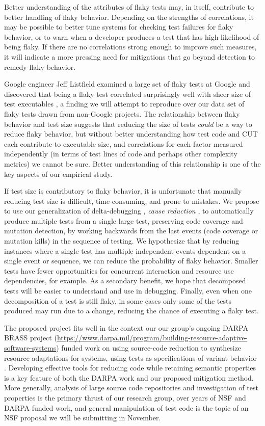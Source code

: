 \documentclass[10pt]{article}
\begin{document}
  Better understanding of the attributes of flaky tests may, in itself, contribute to better handling of flaky behavior.  Depending on the strengths of correlations, it may be possible to better tune systems for checking test failures for flaky behavior, or to warn when a developer produces a test that has high likelihood of being flaky.  If there are no correlations strong enough to improve such measures, it will indicate a more pressing need for mitigations that go beyond detection to remedy flaky behavior.

Google engineer Jeff Listfield examined a large set of flaky tests at Google and discovered that being a flaky test correlated surprisingly well with sheer size of test executables \cite{listfieldtestanalysis}, a finding we will attempt to reproduce over our data set of flaky tests drawn from non-Google projects.  The relationship between flaky behavior and test size suggests that reducing the size of tests \emph{could} be a way to reduce flaky behavior, but without better understanding how test code and CUT each contribute to executable size, and correlations for  each factor measured independently (in terms of test lines of code and perhaps other complexity metrics) we cannot be sure.  Better understanding of this relationship is one of the key aspects of our empirical study.

If test size is contributory to flaky behavior, it is unfortunate that manually reducing test size is difficult, time-consuming, and prone to mistakes.  We propose to use our generalization of delta-debugging \cite{DD}, \emph{cause reduction} \cite{stvrcausereduce}, to automatically produce multiple tests from a single large test, preserving code coverage and mutation detection, by working backwards from the last events (code coverage or mutation kills) in the sequence of testing.  We hypothesize that by reducing instances where a single test has multiple independent events dependent on a single event or sequence, we can reduce the probability of flaky behavior.  Smaller tests have fewer opportunities for concurrent interaction and resource use dependencies, for example.  As a secondary benefit, we hope that decomposed tests will be easier to understand and use in debugging.  Finally, even when one decomposition of a test is still flaky, in some cases only some of the tests produced may run due to a change, reducing the chance of executing a flaky test.

  The proposed project fits well in the context our our group's ongoing DARPA BRASS project (\url{https://www.darpa.mil/program/building-resource-adaptive-software-systems}) funded work on using source-code reduction to synthesize resource adaptations for systems, using tests as specifications of variant behavior \cite{SASO}.  Developing effective tools for reducing code while retaining semantic properties is a key feature of both the DARPA work and our proposed mitigation method.  More generally, analysis of large source code repositories and investigation of test properties is the primary thrust of our research group, over years of NSF and DARPA funded work, and general manipulation of test code is the topic of an NSF proposal we will be submitting in November.
\end{document}
